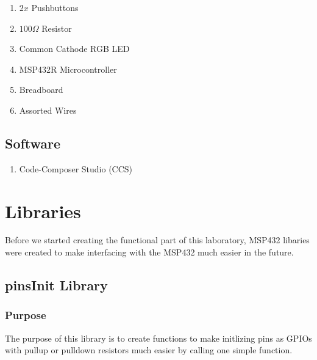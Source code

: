 \documentclass[11pt,a4paper]{article}
\begin{document}
\begin{enumerate}
  \item \(2x\) Pushbuttons
  \item \(100\Omega\) Resistor
  \item Common Cathode RGB LED
  \item MSP432R Microcontroller
  \item Breadboard
  \item Assorted Wires
\end{enumerate}

\subsection{Software}

\begin{enumerate}
  \item Code-Composer Studio (CCS)
\end{enumerate}

\section{Libraries}
Before we started creating the functional part of this laboratory, MSP432 libaries were created to make 
interfacing with the MSP432 much easier in the future.
\subsection{pinsInit Library}
\subsubsection{Purpose}
The purpose of this library is to create functions to make initlizing pins as GPIOs with pullup or pulldown
resistors much easier by calling one simple function.
\end{document}
